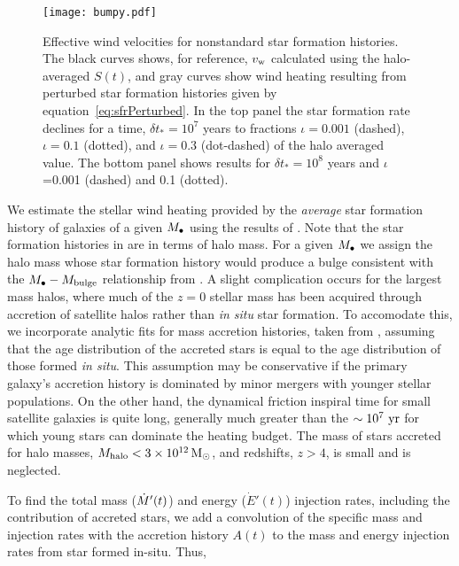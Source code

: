  \begin{figure}
  \texttt{[image: bumpy.pdf]}
  \caption{\label{fig:NickPlot2} Effective wind velocities for
    nonstandard star formation histories.  The black curves shows, for
    reference, $v_{\rm w}$ calculated using the halo-averaged $S(t)$,
    and gray curves show wind heating resulting from perturbed star
    formation histories given by equation~\eqref{eq:sfrPerturbed}. In
    the top panel the star formation rate declines for a time, $\delta
    t_*=10^{7}$ years to fractions $\iota= 0.001$ (dashed), $\iota
    =0.1$ (dotted), and $\iota = 0.3$ (dot-dashed) of the halo
    averaged value. The bottom panel shows results for $\delta
    t_*=10^{8}$ years and $\iota$=0.001 (dashed) and 0.1 (dotted).}
  \end{figure}
  We estimate the stellar wind heating provided by the {\it average}
  star formation history of galaxies of a given $M_{\bullet}$ using the
  results of \citet[eqs.~17-20]{MosterNaab+:2013a}.  Note that the
  star formation histories in \citet{MosterNaab+:2013a} are in terms
  of halo mass. For a given $M_{\bullet}$ we assign the halo mass whose star
  formation history would produce a bulge consistent with the
  $M_{\bullet}-M_{\rm bulge}$ relationship from \citet{McConnellMa:2013a}.  A
  slight complication occurs for the largest mass halos, where much of
  the $z=0$ stellar mass has been acquired through accretion of
  satellite halos rather than {\it in situ} star formation.  To
  accomodate this, we incorporate analytic fits for mass accretion
  histories, taken from \citet[their eqs.~21-23]{MosterNaab+:2013a},
  assuming that the age distribution of the accreted stars is equal to
  the age distribution of those formed {\it in situ}.  This assumption
  may be conservative if the primary galaxy's accretion history is
  dominated by minor mergers with younger stellar populations.  On the
  other hand, the dynamical friction inspiral time for small satellite
  galaxies is quite long, generally much greater than the $\sim
  10^7~{\rm yr}$ for which young stars can dominate the heating
  budget.  The mass of stars accreted for halo masses, $M_{\rm halo}< 3
  \times 10^{12} \,{\rm M_\odot}$, and redshifts, $z>4$, is small and is neglected.

  To find the total mass ($\dot{M}'(t)$) and energy ($\dot{E}'(t)$)
  injection rates, including the contribution of accreted stars, we
  add a convolution of the specific mass and injection rates with the
  accretion history $A(t)$ to the mass and energy injection rates from
  star formed in-situ.  Thus,

